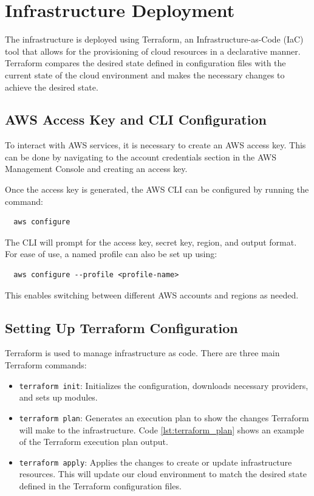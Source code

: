 \section{Infrastructure Deployment}
The infrastructure is deployed using Terraform, an Infrastructure-as-Code (IaC) tool that allows for the provisioning of cloud resources in a declarative manner. Terraform compares the desired state defined in configuration files with the current state of the cloud environment and makes the necessary changes to achieve the desired state.

\subsection{AWS Access Key and CLI Configuration}
To interact with AWS services, it is necessary to create an AWS access key. This can be done by navigating to the account credentials section in the AWS Management Console and creating an access key.

Once the access key is generated, the AWS CLI can be configured by running the command:
\begin{verbatim}
  aws configure
\end{verbatim}
The CLI will prompt for the access key, secret key, region, and output format. For ease of use, a named profile can also be set up using:
\begin{verbatim}
  aws configure --profile <profile-name>
\end{verbatim}
This enables switching between different AWS accounts and regions as needed.

\subsection{Setting Up Terraform Configuration}
Terraform is used to manage infrastructure as code. There are three main Terraform commands:
\begin{itemize}
    \item \texttt{terraform init}: Initializes the configuration, downloads necessary providers, and sets up modules.
    \item \texttt{terraform plan}: Generates an execution plan to show the changes Terraform will make to the infrastructure. Code \ref{lst:terraform_plan} shows an example of the Terraform execution plan output.
    \item \texttt{terraform apply}: Applies the changes to create or update infrastructure resources. This will update our cloud environment to match the desired state defined in the Terraform configuration files.
\end{itemize}

